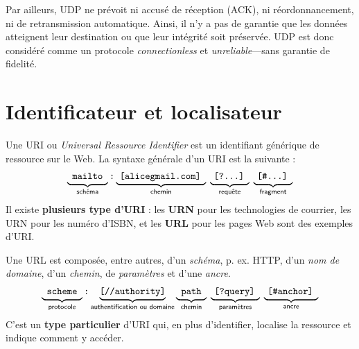 \documentclass[a4paper, 14pt]{report}
\begin{document}
        Par ailleurs, UDP ne prévoit ni accusé de réception (ACK), ni réordonnancement, ni 
        de retransmission automatique. Ainsi, il n'y a pas de garantie que 
        les données atteignent leur destination ou que leur intégrité soit préservée. 
        UDP est donc considéré comme un protocole \textit{connectionless} et 
        \textit{unreliable}---sans garantie de fidelité.   
        
        \section{Identificateur et localisateur}
        Une URI ou \textit{Universal Ressource Identifier} est un identifiant générique 
        de ressource sur le Web. La syntaxe générale d'un URI est la suivante :
        \begin{align*}
        \fontfamily{lmss}\selectfont
         \underbrace{\texttt{\phantom{t}mailto\phantom{g}}}_{\text{schéma}}%
        \texttt{:}%
        \underbrace{\phantom{t}\texttt{[alice\@gmail.com]\phantom{g}}}_{\text{chemin}} \; %
        \underbrace{\phantom{t}\texttt{[?...]\phantom{g}}}_{\text{requête}} \; %
        \underbrace{\phantom{t}\texttt{[\#...]\phantom{g}}}_{\text{fragment}} 
        \\ 
        \end{align*}
        Il existe \textbf{plusieurs type d'\uppercase{uri}} : les \textbf{\uppercase{urn} }  pour les technologies de courrier,
        les \uppercase{urn} pour 
        les numéro d'\uppercase{isbn}, et les \textbf{\uppercase{URL}}  
        pour les pages Web sont des exemples d'\uppercase{uri}. 


        \begin{Concept}[URL]
            Une \uppercase{url} est composée, entre autres, 
            d'un \textit{schéma}, p. ex. \uppercase{HTTP}, 
        d'un \textit{nom de domaine}, d'un \textit{chemin}, de 
        \textit{paramètres}  
        et d'une \textit{ancre}.   
        \begin{align*}
        \fontfamily{lmss}\selectfont
         \underbrace{\texttt{\phantom{t}scheme\phantom{g}}}_{\text{protocole}}%
        \texttt{:}%
        \underbrace{\texttt{[//authority]}}_{\text{authentification ou domaine}}%
        \underbrace{\texttt{\phantom{t}path\phantom{g}}}_{\text{chemin}} \; %
        \underbrace{\phantom{t}\texttt{[?query]}\phantom{g}}_{\text{paramètres}} \;%
        \underbrace{\phantom{t}\texttt{[\#anchor]\phantom{g}}}_{\text{ancre}}
        \\ 
        \end{align*}
        C'est un \textbf{type particulier} d'\uppercase{uri} qui, en plus d'identifier, localise la ressource 
        et indique comment y accéder. 
    \end{Concept}
\end{document}
